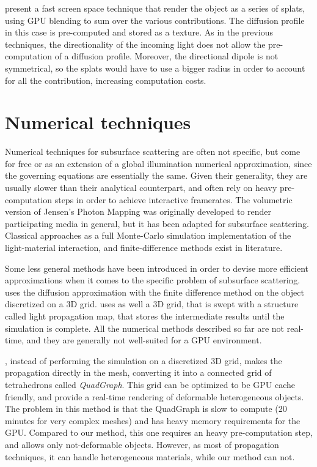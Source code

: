 \cite{4736459} present a fast screen space technique that render the object as a series of splats, using GPU blending to sum over the various contributions. The diffusion profile in this case is pre-computed and stored as a texture. As in the previous techniques, the directionality of the incoming light does not allow the pre-computation of a diffusion profile. Moreover, the directional dipole is not symmetrical, so the splats would have to use a bigger radius in order to account for all the contribution, increasing computation costs.

\section{Numerical techniques}

Numerical techniques for subsurface scattering are often not specific, but come for free or as an extension of a global illumination numerical approximation, since the governing equations are essentially the same. Given their generality, they are usually slower than their analytical counterpart, and often rely on heavy pre-computation steps in order to achieve interactive framerates. The volumetric version of Jensen's Photon Mapping\citep{Jensen:1998:ESL:280814.280925} was originally developed to render participating media in general, but it has been adapted for subsurface scattering\citep{Dorsey:1999:MRW:311535.311560}. Classical approaches as a full Monte-Carlo simulation implementation of the light-material interaction, and finite-difference methods exist in literature\citep{raey}. 

Some less general methods have been introduced in order to devise more efficient approximations when it comes to the specific problem of subsurface scattering. \cite{raey} uses the diffusion approximation with the finite difference method on the object discretized on a 3D grid. \cite{Fattal:2009:PMI:1477926.1477933} uses as well a 3D grid, that is swept with a structure called light propagation map, that stores the intermediate results until the simulation is complete. All the numerical methods described so far are not real-time, and they are generally not well-suited for a GPU environment. 

\cite{journals/cgf/WangWHSYG10}, instead of performing the simulation on a discretized 3D grid, makes the propagation directly in the mesh, converting it into a connected grid of tetrahedrons called \emph{QuadGraph}. This grid can be optimized to be GPU cache friendly, and provide a real-time rendering of deformable heterogeneous objects. The problem in this method is that the QuadGraph is slow to compute (20 minutes for very complex meshes) and has heavy memory requirements for the GPU. Compared to our method, this one requires an heavy pre-computation step, and allows only not-deformable objects. However, as most of propagation techniques, it can handle heterogeneous materials, while our method can not.

